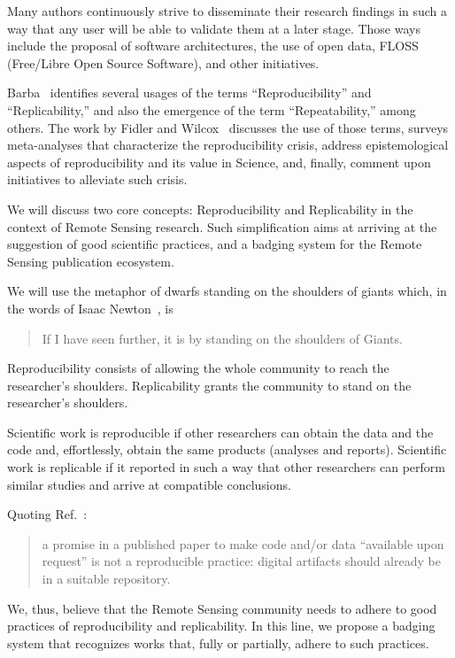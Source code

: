 \documentclass[journal,twoside]{IEEEtran}
\begin{document}
Many authors continuously strive to disseminate their research findings in such a way that any user will be able to validate them at a later stage. 
Those ways include the proposal of software architectures, the use of open data, FLOSS (Free/Libre Open Source Software), and other initiatives.

Barba~\cite{TerminologiesforReproducibleResearch} identifies several usages of the terms ``Reproducibility'' and ``Replicability,'' and also the emergence of the term ``Repeatability,'' among others.
The work by Fidler and Wilcox~\cite{ReproducibilityofScientificResults2018} discusses the use of those terms, surveys meta-analyses that characterize the reproducibility crisis, address epistemological aspects of reproducibility and its value in Science, and, finally, comment upon initiatives to alleviate such crisis.

We will discuss two core concepts: Reproducibility and Replicability in the context of Remote Sensing research.
Such simplification aims at arriving at the suggestion of good scientific practices, and a badging system for the Remote Sensing publication ecosystem.

We will use the metaphor of dwarfs standing on the shoulders of giants which, in the words of Isaac Newton~\cite{LetterNewton}, is
\begin{quote}
	If I have seen further, it is by standing on the shoulders of Giants.
\end{quote}
Reproducibility consists of allowing the whole community to reach the researcher's shoulders.
Replicability grants the community to stand on the researcher's shoulders.

Scientific work is reproducible if other researchers can obtain the data and the code and, effortlessly, obtain the same products (analyses and reports).
Scientific work is replicable if it reported in such a way that other researchers can perform similar studies and arrive at compatible conclusions.

Quoting Ref.~\cite{PraxisofReproducibleComputationalScience}:
\begin{quote}
	a promise in a published paper
	to make code and/or data ``available upon
	request'' is not a reproducible practice: digital
	artifacts should already be in a suitable repository.
\end{quote}

We, thus, believe that the Remote Sensing community needs to adhere to good practices of reproducibility and replicability.
In this line, we propose a badging system that recognizes works that, fully or partially, adhere to such practices.
\end{document}
